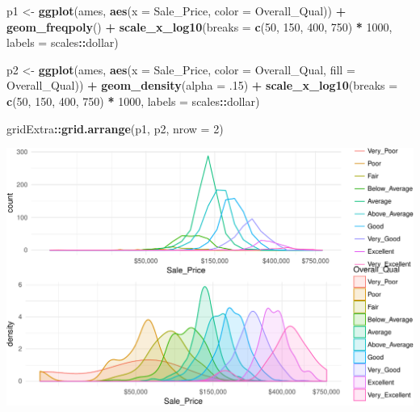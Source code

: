 \documentclass[]{article}
\newenvironment{Shaded}{\begin{snugshade}}{\end{snugshade}}
\newcommand{\KeywordTok}[1]{\textcolor[rgb]{0.13,0.29,0.53}{\textbf{#1}}}
\newcommand{\DataTypeTok}[1]{\textcolor[rgb]{0.13,0.29,0.53}{#1}}
\newcommand{\DecValTok}[1]{\textcolor[rgb]{0.00,0.00,0.81}{#1}}
\newcommand{\StringTok}[1]{\textcolor[rgb]{0.31,0.60,0.02}{#1}}
\newcommand{\OperatorTok}[1]{\textcolor[rgb]{0.81,0.36,0.00}{\textbf{#1}}}
\newcommand{\NormalTok}[1]{#1}
\begin{document}
\begin{Shaded}
\begin{Highlighting}[]
\NormalTok{p1 <-}\StringTok{ }\KeywordTok{ggplot}\NormalTok{(ames, }\KeywordTok{aes}\NormalTok{(}\DataTypeTok{x =}\NormalTok{ Sale_Price, }\DataTypeTok{color =}\NormalTok{ Overall_Qual)) }\OperatorTok{+}
\StringTok{  }\KeywordTok{geom_freqpoly}\NormalTok{() }\OperatorTok{+}
\StringTok{  }\KeywordTok{scale_x_log10}\NormalTok{(}\DataTypeTok{breaks =} \KeywordTok{c}\NormalTok{(}\DecValTok{50}\NormalTok{, }\DecValTok{150}\NormalTok{, }\DecValTok{400}\NormalTok{, }\DecValTok{750}\NormalTok{) }\OperatorTok{*}\StringTok{ }\DecValTok{1000}\NormalTok{, }\DataTypeTok{labels =}\NormalTok{ scales}\OperatorTok{::}\NormalTok{dollar)}
  
\NormalTok{p2 <-}\StringTok{ }\KeywordTok{ggplot}\NormalTok{(ames, }\KeywordTok{aes}\NormalTok{(}\DataTypeTok{x =}\NormalTok{ Sale_Price, }\DataTypeTok{color =}\NormalTok{ Overall_Qual, }\DataTypeTok{fill =}\NormalTok{ Overall_Qual)) }\OperatorTok{+}
\StringTok{  }\KeywordTok{geom_density}\NormalTok{(}\DataTypeTok{alpha =}\NormalTok{ .}\DecValTok{15}\NormalTok{) }\OperatorTok{+}
\StringTok{  }\KeywordTok{scale_x_log10}\NormalTok{(}\DataTypeTok{breaks =} \KeywordTok{c}\NormalTok{(}\DecValTok{50}\NormalTok{, }\DecValTok{150}\NormalTok{, }\DecValTok{400}\NormalTok{, }\DecValTok{750}\NormalTok{) }\OperatorTok{*}\StringTok{ }\DecValTok{1000}\NormalTok{, }\DataTypeTok{labels =}\NormalTok{ scales}\OperatorTok{::}\NormalTok{dollar)}

\NormalTok{gridExtra}\OperatorTok{::}\KeywordTok{grid.arrange}\NormalTok{(p1, p2, }\DataTypeTok{nrow =} \DecValTok{2}\NormalTok{)}
\end{Highlighting}
\end{Shaded}

\begin{center}\includegraphics{Chapter_3_-_Visualization_files/figure-latex/unnamed-chunk-3-1} \end{center}
\end{document}

